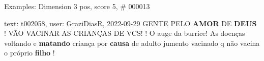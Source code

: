 \begin{frame}{Examples: Dimension 3 pos, score 5, \# 000013}
\footnotesize
\begin{exampleblock}{text: t002058, user: GraziDiasR, 2022-09-29}
GENTE PELO \textbf{AMOR} DE \textbf{DEUS} ! VÃO VACINAR AS CRIANÇAS DE VCS! ! O 
auge da burrice! As doenças voltando e \textbf{matando} criança por 
\textbf{causa} de adulto jumento vacinado q não vacina o próprio \textbf{filho} 
! 
\end{exampleblock}
\end{frame}
